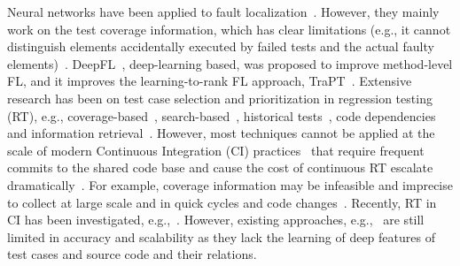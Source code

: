 Neural networks have been applied to fault
localization~\cite{zheng2016fault, briand2007using, zhang2017deep,
  wong2009bp}. However, they mainly work on the test coverage
information, which has clear limitations (e.g., it cannot distinguish
elements accidentally executed by failed tests and the actual faulty
elements)~\cite{li2017transforming}. DeepFL~\cite{DeepFL},
deep-learning based, was proposed to improve method-level FL, and it
improves the learning-to-rank FL approach,
TraPT~\cite{TraPT}. Extensive research has been on test case selection and prioritization in regression testing (RT), e.g., coverage-based~\cite{di2015coverage}, search-based~\cite{de2011multi,yu2010time}, historical tests~\cite{kim2002history,marijan2013test,noor2015similarity,park2008historical}, code dependencies~\cite{gligoric2015ekstazi} and information retrieval~\cite{kwon2014test,saha2015information}. 
However, most techniques cannot be applied at the scale of modern Continuous Integration (CI) practices~\cite{elbaum2014techniques} that require frequent commits to the shared code base and cause the cost of continuous RT escalate dramatically~\cite{memon2017taming}. For example, coverage information may be infeasible and imprecise to collect at large scale and in quick cycles and code changes~\cite{elbaum2014techniques,haghighatkhah2018test,hemmati2015prioritizing,yu2018study}. 
Recently, RT in CI has been investigated, e.g.,~\cite{elbaum2014techniques,gligoric2015practical,yu2018study,jiang2009adaptive,henard2016comparing}. 
However, existing approaches, e.g.,~\cite{bertolino2020learning,spieker2017reinforcement} are still limited in accuracy and scalability as they lack the learning of deep features of test cases and source code and their relations. 


